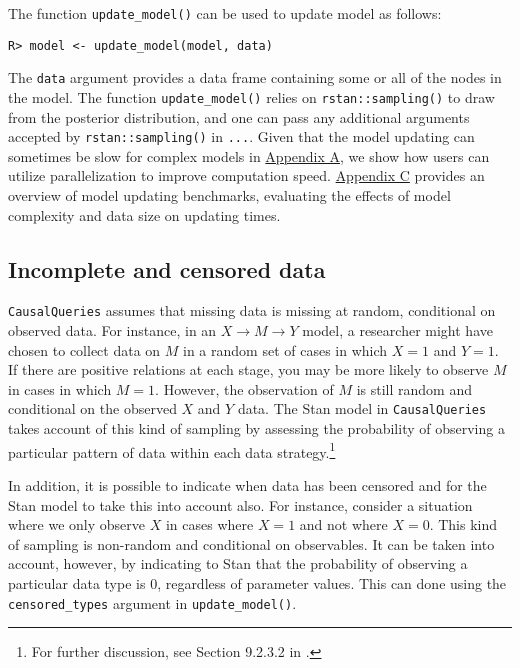 \documentclass[
  11pt,
  article]{jss}
\begin{document}
The function \texttt{update\_model()} can be used to update model as
follows:

\begin{verbatim}
R> model <- update_model(model, data)
\end{verbatim}

The \texttt{data} argument provides a data frame containing some or all
of the nodes in the model. The function \texttt{update\_model()} relies
on \texttt{rstan::sampling()} to draw from the posterior distribution,
and one can pass any additional arguments accepted by
\texttt{rstan::sampling()} in \texttt{...}. Given that the model
updating can sometimes be slow for complex models in
\protect\hyperlink{sec-parallel}{Appendix A}, we show how users can
utilize parallelization to improve computation speed.
\protect\hyperlink{sec-benchmark}{Appendix C} provides an overview of
model updating benchmarks, evaluating the effects of model complexity
and data size on updating times.

\hypertarget{incomplete-and-censored-data}{%
\subsection{Incomplete and censored
data}\label{incomplete-and-censored-data}}

\texttt{CausalQueries} assumes that missing data is missing at random,
conditional on observed data. For instance, in an
\(X \rightarrow M \rightarrow Y\) model, a researcher might have chosen
to collect data on \(M\) in a random set of cases in which \(X=1\) and
\(Y=1\). If there are positive relations at each stage, you may be more
likely to observe \(M\) in cases in which \(M=1\). However, the
observation of \(M\) is still random and conditional on the observed
\(X\) and \(Y\) data. The Stan model in \texttt{CausalQueries} takes
account of this kind of sampling by assessing the probability of
observing a particular pattern of data within each data
strategy.\footnote{For further discussion, see Section 9.2.3.2 in
  \citet{humphreys_integrated_2023}.}

In addition, it is possible to indicate when data has been censored and
for the Stan model to take this into account also. For instance,
consider a situation where we only observe \(X\) in cases where \(X=1\)
and not where \(X=0\). This kind of sampling is non-random and
conditional on observables. It can be taken into account, however, by
indicating to Stan that the probability of observing a particular data
type is \(0\), regardless of parameter values. This can done using the
\texttt{censored\_types} argument in \texttt{update\_model()}.
\end{document}
